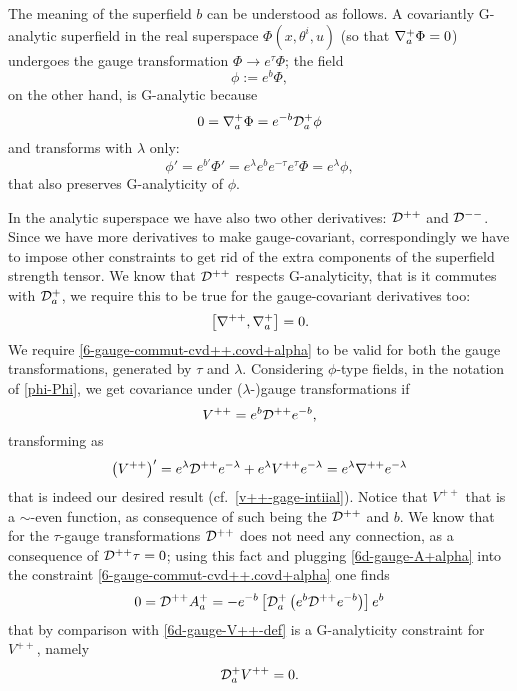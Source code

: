 The meaning of the superfield $b$ can be understood as follows. A covariantly G-analytic superfield in the real superspace \( \Phi(x,\theta^i,u) \) (so that ${ \mathcal{\nabla} }^+_a \Phi = 0$) undergoes the gauge transformation \( \Phi \rightarrow e^{\tau} \Phi  \); the field 
\begin{equation}\label{phi-Phi}
\phi := e^b \Phi,
\end{equation}
on the other hand, is G-analytic because
\begin{equation}
0 = { \mathcal{\nabla} }^+_a \Phi = e^{-b} { \mathcal{D} }^+_a \phi
\end{equation} 
 and transforms with $\lambda$ only:
\begin{equation}
\phi' =
	e^{b'}\Phi' =  
e^{ \lambda} e^b e^{-\tau} e^{\tau} \Phi = e^{\lambda} \phi,
\end{equation}
that also preserves G-analyticity of $\phi$.


In the analytic superspace we have also two other  derivatives: ${ \mathcal{D} }^{++}$ and ${ \mathcal{D} }^{--}$. Since we have more derivatives to make gauge-covariant, correspondingly we have to impose other constraints to get rid of the extra components of the superfield strength tensor. We know that ${ \mathcal{D} }^{++}$ respects G-analyticity, that is it commutes with \( { \mathcal{D} }^+_a \),  we require this to be true for the gauge-covariant derivatives too:
\begin{equation}\label{6-gauge-commut-cvd++.covd+alpha}
\left[ { \mathcal{\nabla} }^{++}  ,  { \mathcal{\nabla} }^+_a  \right]
	=
0.
\end{equation}
We require \eqref{6-gauge-commut-cvd++.covd+alpha} to be valid for both the   gauge transformations, generated by $\tau$ and $\lambda$. Considering $\phi$-type fields, in the notation of \eqref{phi-Phi}, we get covariance under ($\lambda$-)gauge transformations if
\begin{equation}\label{6d-gauge-V++-def}
V^{++} = e^{b} { \mathcal{D} }^{++} e^{-b},
\end{equation}
transforming as
\begin{equation}\label{6d-gauge-V++-gauge-transf}
\left( V^{++} \right)' 
	=
e^{\lambda} { \mathcal{D} }^{++} e^{-\lambda} + e^{\lambda} V^{++} e^{-\lambda}
	=
e^{\lambda} { \mathcal{\nabla} }^{++} e^{-\lambda} 
\end{equation}
that is indeed our desired result (cf.\ \eqref{v++-gage-intiial}). Notice that $V^{++}$  that is a $\sim$-even function, as consequence of such being the ${ \mathcal{D} }^{++}$ and $b$.
We know that for the $\tau$-gauge transformations ${ \mathcal{D} }^{++}$ does not need any connection, as a consequence of ${ \mathcal{D} }^{++} \tau = 0$; using this fact and plugging \eqref{6d-gauge-A+alpha} into the constraint \eqref{6-gauge-commut-cvd++.covd+alpha} one finds
\begin{equation}
0 = \covDs^{++} A^+_a %
= - e^{-b} \left[  \covDs^+_a \left(  e^b \covDs^{++} e^{-b}   \right)  \right] e^b
\end{equation}
that by comparison with \eqref{6d-gauge-V++-def} is a G-analyticity constraint for $V^{++}$, namely
\begin{equation}
{ \mathcal{D} }^+_a V^{++} = 0.
\end{equation}

